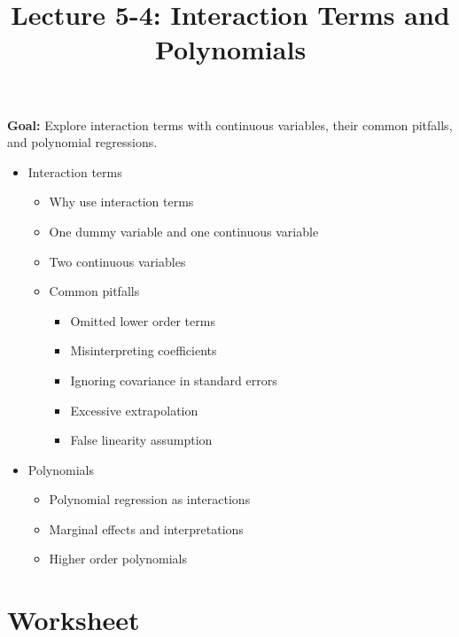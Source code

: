 \documentclass[12pt]{article}
\title{\Large Lecture 5-4: Interaction Terms and Polynomials}
\author{}
\date{}
\begin{document}
\maketitle
\vspace{-6em}

\noindent \textbf{Goal:} Explore interaction terms with continuous variables, their common pitfalls, and polynomial regressions.\medskip

\begin{itemize}\setlength{\itemsep}{1em}
\item Interaction terms
\begin{itemize}
\item Why use interaction terms
\item One dummy variable and one continuous variable
\item Two continuous variables
\item Common pitfalls
\begin{itemize}
\item Omitted lower order terms
\item Misinterpreting coefficients
\item Ignoring covariance in standard errors
\item Excessive extrapolation
\item False linearity assumption
\end{itemize}
\end{itemize}
\item Polynomials
\begin{itemize}
\item Polynomial regression as interactions
\item Marginal effects and interpretations
\item Higher order polynomials
\end{itemize}
\end{itemize}


\clearpage
\onehalfspacing

\section*{Worksheet}
\end{document}
